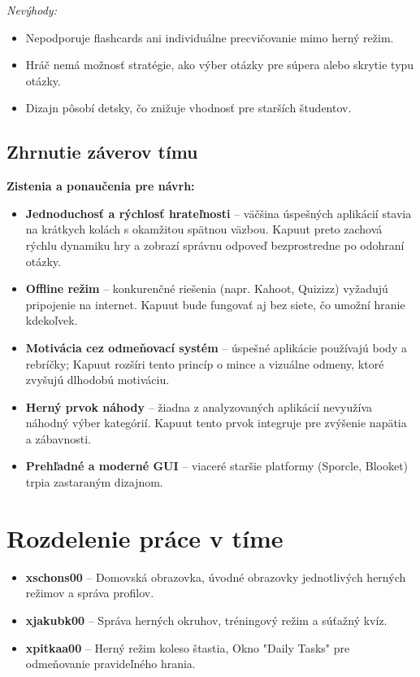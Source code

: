 \documentclass[a4paper,12pt]{article}
\begin{document}
\begin{itemize}
	      \textit{Nevýhody:}
	      \begin{itemize}
	      	\item Nepodporuje flashcards ani individuálne precvičovanie mimo herný režim.
	      	\item Hráč nemá možnosť stratégie, ako výber otázky pre súpera alebo skrytie typu otázky.
	      	\item Dizajn pôsobí detsky, čo znižuje vhodnosť pre starších študentov.
	      \end{itemize}
\end{itemize}

    	
    \subsection{Zhrnutie záverov tímu}
    \textbf{Zistenia a ponaučenia pre návrh:}
    \begin{itemize}
        \item \textbf{Jednoduchosť a rýchlosť hrateľnosti} – väčšina úspešných aplikácií stavia na krátkych kolách s okamžitou spätnou väzbou. Kapuut preto zachová rýchlu dynamiku hry a zobrazí správnu odpoveď bezprostredne po odohraní otázky.
        \item \textbf{Offline režim} – konkurenčné riešenia (napr. Kahoot, Quizizz) vyžadujú pripojenie na internet. Kapuut bude fungovať aj bez siete, čo umožní hranie kdekoľvek.
        \item \textbf{Motivácia cez odmeňovací systém} – úspešné aplikácie používajú body a rebríčky; Kapuut rozšíri tento princíp o mince a vizuálne odmeny, ktoré zvyšujú dlhodobú motiváciu.
        \item \textbf{Herný prvok náhody} – žiadna z analyzovaných aplikácií nevyužíva náhodný výber kategórií. Kapuut tento prvok integruje pre zvýšenie napätia a zábavnosti.
        \item \textbf{Prehľadné a moderné GUI} – viaceré staršie platformy (Sporcle, Blooket) trpia zastaraným dizajnom.
    \end{itemize}
    
    \section{Rozdelenie práce v tíme}
    \begin{itemize}
        \item \textbf{xschons00} – Domovská obrazovka, úvodné obrazovky jednotlivých herných režimov a správa profilov.
        \item \textbf{xjakubk00} – Správa herných okruhov, tréningový režim a súťažný kvíz.
        \item \textbf{xpitkaa00} – Herný režim koleso štastia, Okno "Daily Tasks" pre odmeňovanie pravideľného hrania.
    \end{itemize}
    
\end{document}
